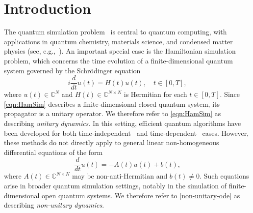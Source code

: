 \documentclass[10pt,reqno]{article}
\numberwithin{equation}{section}
\theoremstyle{plain}
\theoremstyle{definition}
\begin{document}
\setcounter{tocdepth}{2} \tableofcontents

\section{Introduction}
The quantum simulation problem~\cite{feynman1982,feynman1986quantum} is central to quantum computing, with applications in quantum chemistry, materials science, and condensed matter physics (see, e.g.,~\cite{jordan2012quantum,bauer2020quantum,cao2019quantum,babbush2018low}). An important special case is the Hamiltonian simulation problem, which concerns the time evolution of a finite-dimensional quantum system governed by the Schr\"odinger equation
\begin{equation}\label{eqn:HamSim}
    i \frac{d}{dt} u(t) = H(t) u(t), \quad t \in [0,T],
\end{equation}
where \(u(t) \in \mathbb{C}^N\) and \(H(t) \in \mathbb{C}^{N\times N}\) is Hermitian for each \(t \in [0,T]\). Since \cref{eqn:HamSim} describes a finite-dimensional closed quantum system, its propagator is a unitary operator. We therefore refer to \cref{eqn:HamSim} as describing \emph{unitary dynamics}. In this setting, efficient quantum algorithms have been developed for both time-independent~\cite{lloyd1996quantumsimulation,berry2007efficient,BerryChilds2012,BerryChildsCleveEtAl2014,BerryChildsKothari2015,BerryChildsCleveEtAl2015,LowChuang2017,low2019wellconditioned,Childs2021theorytrotter,aftab2024mpf,mizuta2025commutatorscalinghamiltoniansimulation} and time-dependent~\cite{wiebe2010higher,low2019hamiltoniansimulationinteractionpicture,berry2020time,AnFangLin2021,anFang2022time,mizuta2024MPFtimedep} cases. However, these methods do not directly apply to general linear non-homogeneous differential equations of the form
\begin{equation}\label{non-unitary-ode}
    \frac{d}{dt} u(t) = -A(t)u(t) + b(t),
\end{equation}
where \(A(t) \in \mathbb{C}^{N \times N}\) may be non-anti-Hermitian and \(b(t) \neq 0\). Such equations arise in broader quantum simulation settings, notably in the simulation of finite-dimensional open quantum systems. We therefore refer to \cref{non-unitary-ode} as describing \emph{non-unitary dynamics}.
\end{document}
